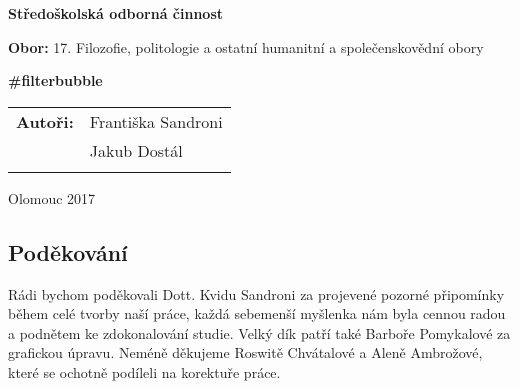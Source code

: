 \pagestyle{empty}
\begin{center}

\medskip

\vfill
{\bfseries\Large{Středoškolská odborná činnost}}

\medskip

{{\bfseries Obor: } 17. Filozofie, politologie a ostatní humanitní a společenskovědní obory}
\vfill


\vspace{20mm}

{\LARGE\bfseries \#filterbubble}

\vfill

\begin{tabular}{ll}
\bfseries Autoři: & Františka Sandroni\\
                  & Jakub Dostál\\
\noalign{\vspace{2mm}}
\end{tabular}

\vfill
Olomouc 2017
\end{center}


\newpage
\openright

\noindent
\subsection*{Poděkování}
\noindent Rádi bychom poděkovali Dott. Kvidu Sandroni za projevené pozorné připomínky během celé tvorby naší práce, každá sebemenší myšlenka nám byla cennou radou a podnětem ke zdokonalování studie. Velký dík patří také Barboře Pomykalové za grafickou úpravu. Neméně děkujeme Roswitě Chvátalové a Aleně Ambrožové, které se ochotně podíleli na korektuře práce.



\newpage

